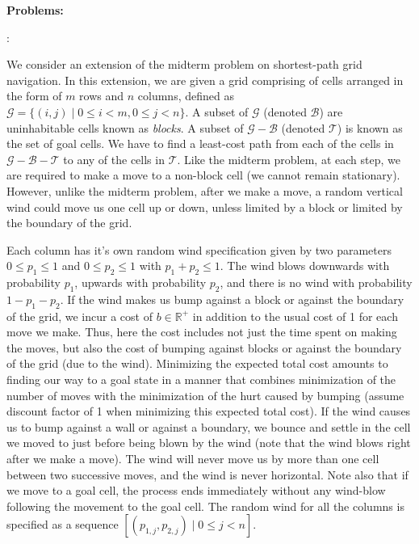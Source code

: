 \documentclass[12pt]{exam}
\begin{document}
 \newpage{}
{\large{\bf Problems:}}
\begin{questions}
: 

We consider an extension of the midterm problem on shortest-path grid navigation. In this extension, we are given a grid comprising of cells arranged in the form of $m$ rows and $n$ columns, defined as $\mathcal{G} = \{(i, j) \mid 0 \leq i < m, 0 \leq j < n\}$. A subset of $\mathcal{G}$ (denoted $\mathcal{B}$) are uninhabitable cells known as {\em blocks}. A subset of $\mathcal{G} - \mathcal{B}$ (denoted $\mathcal{T}$) is known as the set of goal cells. We have to find a least-cost path from each of the cells in $\mathcal{G} - \mathcal{B} - \mathcal{T}$ to any of the cells in $\mathcal{T}$. Like the midterm problem, at each step, we are required to make a move to a non-block cell (we cannot remain stationary). However, unlike the midterm problem, after we make a move, a random vertical wind could move us one cell up or down, unless limited by a block or limited by the boundary of the grid. 

Each column has it's own random wind specification given by two parameters $0 \leq p_1 \leq 1$ and $0 \leq p_2 \leq 1$ with $p_1 + p_2 \leq 1$. The wind blows downwards with probability $p_1$, upwards with probability $p_2$, and there is no wind with probability $1 - p_1 - p_2$. If the wind makes us bump against a block or against the boundary of the grid, we incur a cost of $b \in \mathbb{R}^+$ in addition to the usual cost of 1 for each move we make. Thus, here the cost includes not just the time spent on making the moves, but also the cost of bumping against blocks or against the boundary of the grid (due to the wind). Minimizing the expected total cost amounts to finding our way to a goal state in a manner that combines minimization of the number of moves with the minimization of the hurt caused by bumping (assume discount factor of 1 when minimizing this expected total cost). If the wind causes us to bump against a wall or against a boundary, we bounce and settle in the cell we moved to just before being blown by the wind (note that the wind blows right after we make a move). The wind will never move us by more than one cell between two successive moves, and the wind is never horizontal. Note also that if we move to a goal cell, the process ends immediately without any wind-blow following the movement to the goal cell. The random wind for all the columns is specified as a sequence $[(p_{1,j}, p_{2,j}) \mid 0 \leq j < n]$.


\end{questions}
\end{document}
